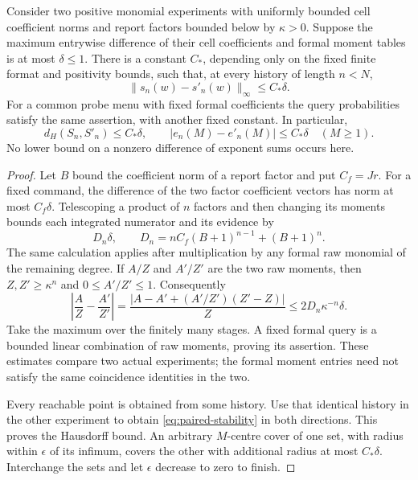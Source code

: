 \begin{lemma}\label{lem:paired-history}
Consider two positive monomial experiments with uniformly bounded cell
coefficient norms and report factors bounded below by $\kappa>0$.
Suppose the maximum entrywise difference of their cell coefficients and
formal moment tables is at most $\delta\le1$. There is a constant $C_*$,
depending only on the fixed finite format and positivity bounds, such
that, at every history of length $n<N$,
\begin{equation}\label{eq:paired-stability}
 \|s_n(w)-s'_n(w)\|_\infty\le C_*\delta.
\end{equation}
For a common probe menu with fixed formal coefficients the query
probabilities satisfy the same assertion, with another fixed constant.
In particular,
\begin{equation}\label{eq:hausdorff-profile}
 d_H(S_n,S'_n)\le C_*\delta,\qquad
 |e_n(M)-e'_n(M)|\le C_*\delta\quad(M\ge1).
\end{equation}
No lower bound on a nonzero difference of exponent sums occurs here.
\end{lemma}
\begin{proof}
Let $B$ bound the coefficient norm of a report factor and put $C_f=Jr$.
For a fixed command, the difference of the two factor coefficient
vectors has norm at most $C_f\delta$. Telescoping a product of $n$
factors and then changing its moments bounds each integrated numerator
and its evidence by
\[
 D_n\delta,\qquad
 D_n=nC_f(B+1)^{n-1}+(B+1)^n.
\]
The same calculation applies after multiplication by any formal raw
monomial of the remaining degree. If $A/Z$ and $A'/Z'$ are the two
raw moments, then $Z,Z'\ge\kappa^n$ and $0\le A'/Z'\le1$.
Consequently
\[
 \left|\frac A Z-\frac{A'}{Z'}\right|
 =\frac{|A-A'+(A'/Z')(Z'-Z)|}{Z}
 \le 2D_n\kappa^{-n}\delta.
\]
Take the maximum over the finitely many stages. A fixed formal query
is a bounded linear combination of raw moments, proving its assertion.
These estimates compare two actual experiments; the formal moment
entries need not satisfy the same coincidence identities in the two.

Every reachable point is obtained from some history. Use that identical
history in the other experiment to obtain \eqref{eq:paired-stability}
in both directions. This proves the Hausdorff bound. An arbitrary
$M$-centre cover of one set, with radius within $\epsilon$ of its
infimum, covers the other with additional radius at most $C_*\delta$.
Interchange the sets and let $\epsilon$ decrease to zero to finish.
\end{proof}

